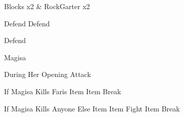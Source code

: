 \begin{paracol}{2}
\begin{steproute}{Blocks x2 \& RockGarter x2}
    \varwb
	\begin{notes}
		\item {}
	\end{notes}
	\begin{round}{1}
		\faris Defend
        \lenna \leftCommand{\black} \then \bolt \space \then {}
        \galuf Defend
        \bartz \leftCommand{\black} \then \fire \space \then {}
	\end{round}
    \begin{round}{2}
		\faris Defend
        \lenna \leftCommand{\black} \then \fire \space \then {}
	\end{round}
	\varwe
\end{steproute}

\switchcolumn
\begin{boss}{Magisa}
    \varwb
    \begin{bossPart}{During Her Opening Attack}
        \item {}
        \vspace{1mm}
        \item [] 
    \end{bossPart}
    \begin{bossPart}{If Magisa Kills Faris}
        \bartz Item \then \phoenixDown \space \then {}
        \galuf Item \then {} \then Break
    \end{bossPart}
    \begin{bossPart}{If Magisa Kills Anyone Else}
        \faris Item \then \phoenixDown \then {}
        \anyone Item \then {} \then Fight \then {}
        \anyone Item \then {} \then Break
    \end{bossPart}
    \varwe
\end{boss}

\end{paracol}